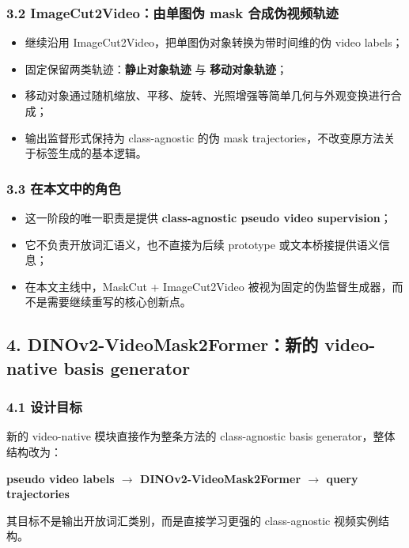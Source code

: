 \documentclass[UTF8]{ctexart}
\begin{document}
\subsubsection*{3.2 ImageCut2Video：由单图伪 mask 合成伪视频轨迹}
\begin{itemize}
\item 继续沿用 ImageCut2Video，把单图伪对象转换为带时间维的伪 video labels；
\item 固定保留两类轨迹：\textbf{静止对象轨迹} 与 \textbf{移动对象轨迹}；
\item 移动对象通过随机缩放、平移、旋转、光照增强等简单几何与外观变换进行合成；
\item 输出监督形式保持为 class-agnostic 的伪 mask trajectories，不改变原方法关于标签生成的基本逻辑。
\end{itemize}

\subsubsection*{3.3 在本文中的角色}
\begin{itemize}
\item 这一阶段的唯一职责是提供 \textbf{class-agnostic pseudo video supervision}；
\item 它不负责开放词汇语义，也不直接为后续 prototype 或文本桥接提供语义信息；
\item 在本文主线中，MaskCut + ImageCut2Video 被视为固定的伪监督生成器，而不是需要继续重写的核心创新点。
\end{itemize}

\par\noindent\hrulefill\par

\subsection*{4. DINOv2-VideoMask2Former：新的 video-native basis generator}

\subsubsection*{4.1 设计目标}
新的 video-native 模块直接作为整条方法的 class-agnostic basis generator，整体结构改为：
\begin{center}
\textbf{pseudo video labels $\rightarrow$ DINOv2-VideoMask2Former $\rightarrow$ query trajectories}
\end{center}
其目标不是输出开放词汇类别，而是直接学习更强的 class-agnostic 视频实例结构。
\end{document}
